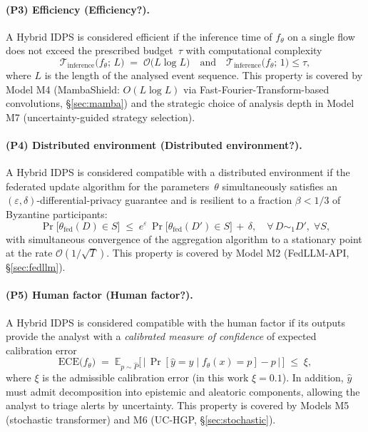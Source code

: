 \paragraph{(P3) Efficiency (Efficiency?).}
A Hybrid IDPS is considered efficient if the inference time of
$f_\theta$ on a single flow does not exceed the prescribed
budget~$\tau$ with computational complexity
\begin{equation}
\mathcal{T}_{\mathrm{inference}}\bigl(f_\theta;\,L\bigr)
\;=\; \mathcal{O}\bigl(L\log L\bigr)
\quad\text{and}\quad
\mathcal{T}_{\mathrm{inference}}\bigl(f_\theta;\,1\bigr) \le \tau,
\label{eq:efficiency_property}
\end{equation}
where $L$ is the length of the analysed event sequence. This
property is covered by Model M4 (\textsf{MambaShield}: $O(L\log L)$
via Fast-Fourier-Transform-based convolutions, \S\ref{sec:mamba})
and the strategic choice of analysis depth in Model M7
(uncertainty-guided strategy selection).

\paragraph{(P4) Distributed environment (Distributed environment?).}
A Hybrid IDPS is considered compatible with a distributed
environment if the federated update algorithm for the
parameters~$\theta$ simultaneously satisfies an
$(\varepsilon,\delta)$-differential-privacy guarantee and is
resilient to a fraction $\beta<1/3$ of Byzantine participants:
\begin{equation}
\Pr\bigl[\theta_{\mathrm{fed}}(D)\in S\bigr] \;\le\;
e^{\varepsilon}\,\Pr\bigl[\theta_{\mathrm{fed}}(D')\in S\bigr]
\,+\,\delta,
\quad
\forall\,D\sim_{1}D',\;\forall S,
\label{eq:distributed_property}
\end{equation}
with simultaneous convergence of the aggregation algorithm to a
stationary point at the rate $\mathcal{O}(1/\sqrt{T})$. This
property is covered by Model M2 (\textsf{FedLLM-API},
\S\ref{sec:fedllm}).

\paragraph{(P5) Human factor (Human factor?).}A Hybrid IDPS is considered compatible with the human factor if its
outputs provide the analyst with a \emph{calibrated measure of
confidence} of expected calibration error\begin{equation}
\mathrm{ECE}\bigl(f_\theta\bigr)
\;=\;
\mathbb{E}_{p\sim\hat{P}}\bigl[\,
\bigl|\,\Pr[\hat{y}=y\mid f_\theta(x)=p]-p\,\bigr|
\,\bigr]
\;\le\; \xi,
\label{eq:calibration_property}
\end{equation}
where $\xi$ is the admissible calibration error (in this work
$\xi=0.1$). In addition, $\hat{y}$ must admit decomposition into
epistemic and aleatoric components, allowing the analyst to triage
alerts by uncertainty. This property is covered by Models M5
(stochastic transformer) and M6 (UC-HGP, \S\ref{sec:stochastic}).

